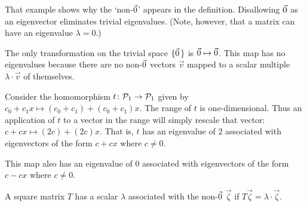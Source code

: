 That example shows why the `non-$\vec{0}$' appears in the definition.
Disallowing \( \vec{0} \) as an eigenvector eliminates trivial eigenvalues.
(Note, however, that a matrix can
have an eigenvalue $\lambda=0$.)

\begin{example}  \label{ex:NoEigenOnTrivSp}
The only transformation on the trivial space \( \mbox{$\{\vec{0}\,\}$} \) is
$\vec{0}\mapsto\vec{0}$.
This map has no eigenvalues because there are no non-\( \vec{0} \) vectors
$\vec{v}$ mapped to a scalar multiple $\lambda\cdot\vec{v}$ of themselves.
\end{example}        

\begin{example}
Consider the homomorphism \( \mbox{$t\colon \mathcal{P}_1\to \mathcal{P}_1$} \)
given by \( c_0+c_1x\mapsto(c_0+c_1)+(c_0+c_1)x \).
The range of \( t \) is one-dimensional.
Thus an application of
\( t \) to a vector in the range will simply rescale that vector:
\( c+cx\mapsto (2c)+(2c)x \).
That is, \( t \) has an eigenvalue of \( 2 \) associated with eigenvectors of
the form \( c+cx \) where \( c\neq 0 \).

This map also has an eigenvalue of \( 0 \) associated with eigenvectors of
the form \( c-cx \) where \( c\neq 0 \).
\end{example}


\begin{definition}
A square matrix \( T \) has a scalar
\( \lambda \) associated with the non-\( \vec{0} \)
 \( \vec{\zeta} \) if
\( T\vec{\zeta}=\lambda\cdot\vec{\zeta} \).
\end{definition}


